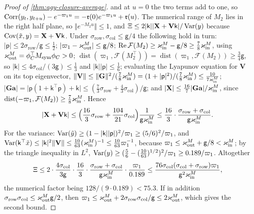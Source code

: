 \begin{proof}[Proof of \cref{thm:agy-closure-average}]
and at $u=0$ the two terms add to one, so $\operatorname{Corr}(y_t,y_{t+u})-e^{-\varpi_1u}=-\mathfrak r(0)e^{-\varpi_1u}+\mathfrak r(u)$. The numerical range of $M_2$ lies in the right half plane, so $\Vert e^{-M_2u}\Vert\le1$, and $\Xi\le2\lvert\mathsf k\rvert\lvert\mathbf X+\mathbf V\mathsf k\rvert/\operatorname{Var}(y)$ because $\operatorname{Cov}(\tilde x,y)=\mathbf X+\mathbf V\mathsf k$. Under $\sigma_{\mathrm{row}},\sigma_{\mathrm{col}}\le\mathsf g/4$ the following hold in turn: $\lvert\mathsf p\rvert\le2\sigma_{\mathrm{row}}/\mathsf g\le\frac12$; $\lvert\varpi_1-\varkappa_{\mathrm{out}}^M\rvert\le\mathsf g/8$; $\operatorname{Re}\mathcal F(M_2)\ge\varkappa_{\mathrm{in}}^M-\mathsf g/8\ge\frac78\varkappa_{\mathrm{in}}^M$, using $\varkappa_{\mathrm{out}}^M=\phi_C^\top M_{\mathrm{sym}}\phi_C>0$; $\operatorname{dist}(\varpi_1,\mathcal F(M_2^\top))=\operatorname{dist}(\varpi_1,\mathcal F(M_2))\ge\frac34\mathsf g$, so $\lvert\mathsf k\rvert\le4\sigma_{\mathrm{col}}/(3\mathsf g)\le\frac13$ and $\lvert\mathsf k\rvert\lvert\mathsf p\rvert\le\frac16$; evaluating the Lyapunov equation for $\mathbf V$ on its top eigenvector, $\Vert\mathbf V\Vert\le\Vert\mathbf G\Vert^2/(\frac78\varkappa_{\mathrm{in}}^M)=(1+\lvert\mathsf p\rvert^2)/(\frac78\varkappa_{\mathrm{in}}^M)\le\frac{10}{7\varkappa_{\mathrm{in}}^M}$; $\lvert\mathbf G\mathbf a\rvert=\lvert\mathsf p(1+\mathsf k^\top\mathsf p)+\mathsf k\rvert\le(\frac73\sigma_{\mathrm{row}}+\frac43\sigma_{\mathrm{col}})/\mathsf g$; and $\lvert\mathbf X\rvert\le\frac{16}{7}\lvert\mathbf G\mathbf a\rvert/\varkappa_{\mathrm{in}}^M$, since $\operatorname{dist}(-\varpi_1,\mathcal F(M_2))\ge\frac78\varkappa_{\mathrm{in}}^M$. Hence
\begin{equation*}
\lvert\mathbf X+\mathbf V\mathsf k\rvert\le\Bigl(\frac{16}3\sigma_{\mathrm{row}}+\frac{104}{21}\sigma_{\mathrm{col}}\Bigr)\frac1{\mathsf g\varkappa_{\mathrm{in}}^M}\le\frac{16}3\cdot\frac{\sigma_{\mathrm{row}}+\sigma_{\mathrm{col}}}{\mathsf g\varkappa_{\mathrm{in}}^M}.
\end{equation*}
For the variance: $\operatorname{Var}(\tilde y)\ge(1-\lvert\mathsf k\rvert\lvert\mathsf p\rvert)^2/\varpi_1\ge(5/6)^2/\varpi_1$, and $\operatorname{Var}(\mathsf k^\top\tilde x)\le\lvert\mathsf k\rvert^2\Vert\mathbf V\Vert\le\frac{10}{63}(\varkappa_{\mathrm{in}}^M)^{-1}\le\frac{10}{63}\varpi_1^{-1}$, because $\varpi_1\le\varkappa_{\mathrm{out}}^M+\mathsf g/8<\varkappa_{\mathrm{in}}^M$; by the triangle inequality in $L^2$, $\operatorname{Var}(y)\ge(\frac56-(\frac{10}{63})^{1/2})^2/\varpi_1\ge0.189/\varpi_1$. Altogether
\begin{equation*}
\Xi\le2\cdot\frac{4\sigma_{\mathrm{col}}}{3\mathsf g}\cdot\frac{16}3\cdot\frac{\sigma_{\mathrm{row}}+\sigma_{\mathrm{col}}}{\mathsf g\varkappa_{\mathrm{in}}^M}\cdot\frac{\varpi_1}{0.189}\le\frac{76\sigma_{\mathrm{col}}(\sigma_{\mathrm{col}}+\sigma_{\mathrm{row}})\varpi_1}{\mathsf g^2\varkappa_{\mathrm{in}}^M},
\end{equation*}
the numerical factor being $128/(9\cdot0.189)<75.3$. If in addition $\sigma_{\mathrm{row}}\sigma_{\mathrm{col}}\le\varkappa_{\mathrm{out}}^M\mathsf g/2$, then $\varpi_1\le\varkappa_{\mathrm{out}}^M+2\sigma_{\mathrm{row}}\sigma_{\mathrm{col}}/\mathsf g\le2\varkappa_{\mathrm{out}}^M$, which gives the second bound.


\end{proof}
